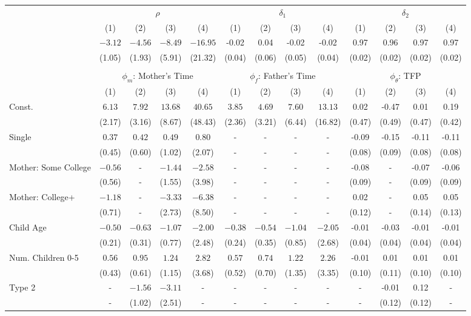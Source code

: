 \begin{tabular}{lcccccccccccc}\\\toprule
 & \multicolumn{4}{c}{$\rho$} & \multicolumn{4}{c}{$\delta_{1}$} & \multicolumn{4}{c}{$\delta_{2}$} \\
&(1)&(2)&(3)&(4)&(1)&(2)&(3)&(4)&(1)&(2)&(3)&(4)\\\cmidrule(r){2-5}\cmidrule(r){6-9}\cmidrule(r){10-13}
&$-3.12$&$-4.56$&$-8.49$&$-16.95$&-0.02&0.04&-0.02&-0.02&0.97&0.96&0.97&0.97\\
&(1.05)&(1.93)&(5.91)&(21.32)&(0.04)&(0.06)&(0.05)&(0.04)&(0.02)&(0.02)&(0.02)&(0.02)\\
&&&&&&&&&&&&\\
 & \multicolumn{4}{c}{$\phi_{m}$: Mother's Time} & \multicolumn{4}{c}{$\phi_{f}$: Father's Time} & \multicolumn{4}{c}{$\phi_{\theta}$: TFP} \\
&(1)&(2)&(3)&(4)&(1)&(2)&(3)&(4)&(1)&(2)&(3)&(4)\\\cmidrule(r){2-5}\cmidrule(r){6-9}\cmidrule(r){10-13}
Const.&$6.13$&$7.92$&$13.68$&$40.65$&$3.85$&$4.69$&$7.60$&$13.13$&0.02&-0.47&0.01&0.19\\
&(2.17)&(3.16)&(8.67)&(48.43)&(2.36)&(3.21)&(6.44)&(16.82)&(0.47)&(0.49)&(0.47)&(0.42)\\
Single&$0.37$&$0.42$&$0.49$&$0.80$&-&-&-&-&-0.09&-0.15&-0.11&-0.11\\
&(0.45)&(0.60)&(1.02)&(2.07)&-&-&-&-&(0.08)&(0.09)&(0.08)&(0.08)\\
Mother: Some College&$-0.56$&-&$-1.44$&$-2.58$&-&-&-&-&-0.08&-&-0.07&-0.06\\
&(0.56)&-&(1.55)&(3.98)&-&-&-&-&(0.09)&-&(0.09)&(0.09)\\
Mother: College+&$-1.18$&-&$-3.33$&$-6.38$&-&-&-&-&0.02&-&0.05&0.05\\
&(0.71)&-&(2.73)&(8.50)&-&-&-&-&(0.12)&-&(0.14)&(0.13)\\
Child Age&$-0.50$&$-0.63$&$-1.07$&$-2.00$&$-0.38$&$-0.54$&$-1.04$&$-2.05$&-0.01&-0.03&-0.01&-0.01\\
&(0.21)&(0.31)&(0.77)&(2.48)&(0.24)&(0.35)&(0.85)&(2.68)&(0.04)&(0.04)&(0.04)&(0.04)\\
Num. Children 0-5&$0.56$&$0.95$&$1.24$&$2.82$&$0.57$&$0.74$&$1.22$&$2.26$&-0.01&0.01&0.01&0.01\\
&(0.43)&(0.61)&(1.15)&(3.68)&(0.52)&(0.70)&(1.35)&(3.35)&(0.10)&(0.11)&(0.10)&(0.10)\\
Type 2&-&$-1.56$&$-3.11$&-&-&-&-&-&-&-0.01&0.12&-\\
&-&(1.02)&(2.51)&-&-&-&-&-&-&(0.12)&(0.12)&-\\

\end{tabular}
